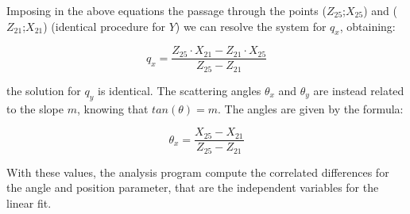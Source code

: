 \begin{appendices}
Imposing in the above equations the passage through the points ($Z_{25}$;$X_{25}$) and ($Z_{21}$;$X_{21}$) (identical procedure for $Y$) we can resolve the system for $q_{x}$, obtaining:

\begin{equation}
q_{x} = \dfrac{Z_{25} \cdot X_{21} - Z_{21} \cdot X_{25}}{Z_{25} - Z_{21}}
\end{equation} 

the solution for $q_{y}$ is identical. The scattering angles $\theta_{x}$ and $\theta_{y}$ are instead related to the slope $m$, knowing that $tan(\theta) = m$. The angles are given by the formula:

\begin{equation}
\theta_{x} = \dfrac{X_{25} - X_{21}}{Z_{25} - Z_{21}}
\end{equation}

With these values, the analysis program compute the correlated differences for the angle and position parameter, that are the independent variables for the linear fit.


\end{appendices}